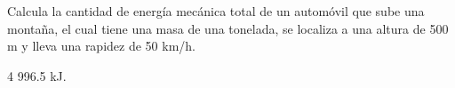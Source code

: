 Calcula la cantidad de energía mecánica total de un automóvil que sube una
montaña, el cual tiene una masa de una tonelada, se localiza a una altura de
500 m y lleva una rapidez de 50 km/h.


\begin{solutionbox}{1.1cm}
    4 996.5 kJ.
\end{solutionbox}
